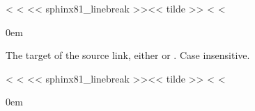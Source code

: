 \documentclass[letterpaper,10pt,english]{sphinxmanual}
\begin{document}
\vspace{5px}

\begin{fulllineitems}
\label{\detokenize{confval:confval-source_link_target}}
<%
\pysigstartsignatures
<%
\pysigline<< sphinx81_linebreak >>{}<< tilde >>
<%
<%
\vspace{-30px}

\begin{DUlineblock}{0em}
\item[]  
\item[]  
\item[]  
\end{DUlineblock}

\vspace{-25px}

The target of the source link, either  or .
Case insensitive.

\end{fulllineitems}


\vspace{5px}

\begin{fulllineitems}
\label{\detokenize{confval:confval-github_username}}
<%
\pysigstartsignatures
<%
\pysigline<< sphinx81_linebreak >>{}<< tilde >>
<%
<%
\vspace{-30px}

\begin{DUlineblock}{0em}
\item[]  
\item[]  
\end{DUlineblock}

\end{fulllineitems}
\end{document}

